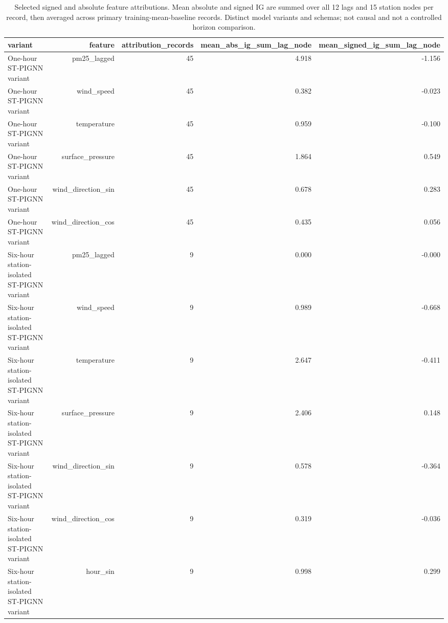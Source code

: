 \begin{table}[t]
\centering
\scriptsize
\caption{Selected signed and absolute feature attributions. Mean absolute and signed IG are summed over all 12 lags and 15 station nodes per record, then averaged across primary training-mean-baseline records. Distinct model variants and schemas; not causal and not a controlled horizon comparison.}
\label{tab:t06b_major_feature_attributions}
\begin{tabular}{lrrrr}
\hline
variant & feature & attribution\_records & mean\_abs\_ig\_sum\_lag\_node & mean\_signed\_ig\_sum\_lag\_node \\
\hline
One-hour ST-PIGNN variant & pm25\_lagged & 45 & 4.918 & -1.156 \\
One-hour ST-PIGNN variant & wind\_speed & 45 & 0.382 & -0.023 \\
One-hour ST-PIGNN variant & temperature & 45 & 0.959 & -0.100 \\
One-hour ST-PIGNN variant & surface\_pressure & 45 & 1.864 & 0.549 \\
One-hour ST-PIGNN variant & wind\_direction\_sin & 45 & 0.678 & 0.283 \\
One-hour ST-PIGNN variant & wind\_direction\_cos & 45 & 0.435 & 0.056 \\
Six-hour station-isolated ST-PIGNN variant & pm25\_lagged & 9 & 0.000 & -0.000 \\
Six-hour station-isolated ST-PIGNN variant & wind\_speed & 9 & 0.989 & -0.668 \\
Six-hour station-isolated ST-PIGNN variant & temperature & 9 & 2.647 & -0.411 \\
Six-hour station-isolated ST-PIGNN variant & surface\_pressure & 9 & 2.406 & 0.148 \\
Six-hour station-isolated ST-PIGNN variant & wind\_direction\_sin & 9 & 0.578 & -0.364 \\
Six-hour station-isolated ST-PIGNN variant & wind\_direction\_cos & 9 & 0.319 & -0.036 \\
Six-hour station-isolated ST-PIGNN variant & hour\_sin & 9 & 0.998 & 0.299 \\
\hline
\end{tabular}
\end{table}

